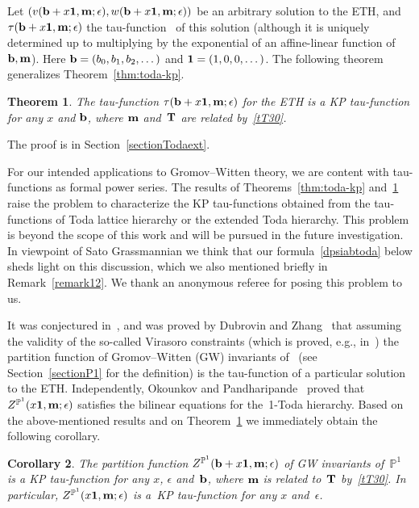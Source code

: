 \documentclass[pdftex]{sigma}
\newcommand{\e}{\epsilon}
\newcommand{\bP}{\mathbb{P}}
\numberwithin{equation}{section}
\newtheorem{Theorem}{Theorem}[section]
\newtheorem{Corollary}[Theorem]{Corollary}
\begin{document}
Let $(v({\bf b}+x{\bf 1}, {\bf m}; \e), w({\bf b}+x{\bf 1}, {\bf m}; \e) )$ be an arbitrary solution
to the ETH, and $\tau({\bf b}+x{\bf 1},{\bf m}; \e)$ the tau-function~\cite{CDZ} of this solution
(although it is uniquely determined up to multiplying by
the exponential of an affine-linear function of ${\bf b}, {\bf m}$). %
Here ${\bf b}=(b_0,b_1,b_2,\dots)$ and ${\bf 1}=(1, 0, 0, \dots)$.
The following theorem
generalizes Theorem~\ref{thm:toda-kp}.
\begin{Theorem} \label{thm:toda-kp-ext}
The tau-function $\tau({\bf b}+x{\bf 1},{\bf m};\e)$ for the ETH
is a KP tau-function for any $x$ and ${\bf b}$, where ${\bf m}$ and~${\bf T}$ are related by~\eqref{tT30}.
\end{Theorem}
The proof is in Section~\ref{sectionTodaext}.

\begin{Remark}
For our intended applications to Gromov--Witten theory, we are content with tau-functions as formal power series.
The results of Theorems~\ref{thm:toda-kp} and~\ref{thm:toda-kp-ext} raise the problem to characterize the KP tau-functions obtained from the tau-functions of Toda lattice
hierarchy or the extended Toda hierarchy. This problem is beyond the scope of this work and will be pursued in the future investigation.
In viewpoint of Sato Grassmannian we think that our formula~\eqref{dpsiabtoda} below sheds light on this discussion, which we also
mentioned briefly in Remark~\ref{remark12}.
We thank an anonymous referee for posing this problem to us.
\end{Remark}

It was conjectured in~\cite{Du93, Du96, EY, Getzler}, and was proved
by Dubrovin and Zhang~\cite{DZ-toda} that assuming the validity of the so-called Virasoro constraints (which is
proved, e.g., in~\cite{OP3})
the partition function \smash{$Z^{\bP^1}({\bf b}+x{\bf 1}, {\bf m}; \e)$} of
Gromov--Witten (GW) invariants of~\smash{$\bP^1$} (see Section~\ref{sectionP1} for the definition) is the tau-function
of a particular solution to the ETH. Independently, Okounkov and Pandharipande~\cite{OP2, OP1} proved that
$Z^{\bP^1}(x{\bf 1}, {\bf m}; \e)$ satisfies the bilinear equations for the~1-Toda hierarchy.
Based on the above-mentioned results and on Theorem~\ref{thm:toda-kp-ext}
we immediately obtain the following corollary.

\begin{Corollary} \label{ThmMainP1}
The partition function $Z^{\bP^1}({\bf b}+x{\bf 1} ,{\bf m}; \e)$ of GW invariants of~$\bP^1$ is a KP tau-function
for any $x$, $\e$ and~${\bf b}$,
where ${\bf m}$ is related to~${\bf T}$ by~\eqref{tT30}. In particular, $Z^{\bP^1}(x{\bf 1},{\bf m};\e)$ is a~KP tau-function for any $x$ and~$\e$.
\end{Corollary}
\end{document}
